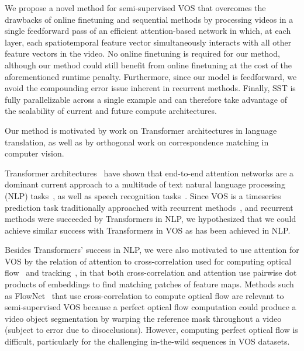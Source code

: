 We propose a novel method for semi-supervised VOS that overcomes the drawbacks
of online finetuning and sequential methods by processing videos in a single
feedforward pass of an efficient attention-based network in which, at each
layer, each spatiotemporal feature vector simultaneously interacts with all
other feature vectors in the video.
No online finetuning is required for our method, although our method could
still benefit from online finetuning at the cost of the aforementioned runtime
penalty.
Furthermore, since our model is feedforward, we avoid the compounding error
issue inherent in recurrent methods.
Finally, SST is fully parallelizable across a single example and can therefore
take advantage of the scalability of current and future compute architectures.

Our method is motivated by work on Transformer architectures in language
translation, as well as by orthogonal work on correspondence matching in
computer vision.

Transformer architectures~\cite{vaswani2017attention} have shown that
end-to-end attention networks are a dominant current approach to a multitude of
text natural language processing (NLP)
tasks~\cite{devlin2019bert, dai2019transformer}, as well as speech recognition
tasks~\cite{luscher2019rwth, kim2019improved}.
Since VOS is a timeseries prediction task traditionally approached with
recurrent methods~\cite{ventura2019rvos}, and recurrent methods were succeeded
by Transformers in NLP, we hypothesized that we could achieve similar success
with Transformers in VOS as has been achieved in NLP\@.

Besides Transformers' success in NLP, we were also motivated to use attention
for VOS by the relation of attention to cross-correlation used for computing
optical flow~\cite{dosovitskiy2015flownet} and tracking~\cite{li2018high}, in
that both cross-correlation and attention use pairwise dot products of
embeddings to find matching patches of feature maps.
Methods such as FlowNet~\cite{dosovitskiy2015flownet} that use
cross-correlation to compute optical flow are relevant to semi-supervised VOS
because a perfect optical flow computation could produce a video object
segmentation by warping the reference mask throughout a video (subject to error
due to disocclusions).
However, computing perfect optical flow is difficult, particularly for the
challenging in-the-wild sequences in VOS datasets.

